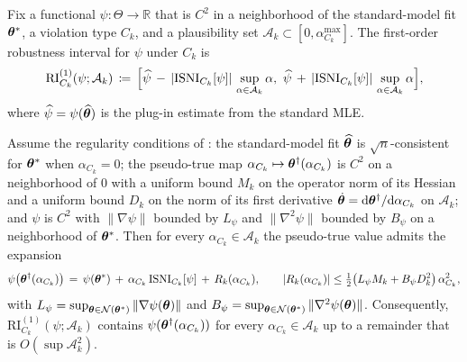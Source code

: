 \begin{definition}
\label{def:robustness-interval}
Fix a functional $\psi \colon \Theta \to \mathbb{R}$ that is $C^2$ in
a neighborhood of the standard-model fit $\bm{\theta}^*$, a violation type
$C_k$, and a plausibility set $\mathcal{A}_k \subset [0,
\alpha_{C_k}^{\max}]$. The first-order robustness interval for $\psi$
under $C_k$ is
\begin{equation}
\label{eq:rob-int}
    \mathrm{RI}_{C_k}^{(1)}(\psi; \mathcal{A}_k)
    \,\coloneqq\,
    \Bigl[
        \widehat\psi
        \,-\, |\mathrm{ISNI}_{C_k}[\psi]|\, \sup_{\alpha \in \mathcal{A}_k} \alpha,
        \ \widehat\psi
        \,+\, |\mathrm{ISNI}_{C_k}[\psi]|\, \sup_{\alpha \in \mathcal{A}_k} \alpha
    \Bigr],
\end{equation}
where $\widehat\psi = \psi(\widehat{\bm{\theta}})$ is the plug-in estimate
from the standard MLE.
\end{definition}

\begin{proposition}
\label{prop:robustness-coverage}
Assume the regularity conditions of :
the standard-model fit $\widehat{\bm{\theta}}$ is $\sqrt{n}$-consistent for
$\bm{\theta}^*$ when $\alpha_{C_k} = 0$; the pseudo-true map
$\alpha_{C_k} \mapsto \bm{\theta}^\dagger(\alpha_{C_k})$ is $C^2$ on a
neighborhood of $0$ with a uniform bound $M_k$ on the operator norm of
its Hessian and a uniform bound $D_k$ on the norm of its first
derivative $\dot{\bm{\theta}} = \mathrm{d}\bm{\theta}^\dagger/\mathrm{d}\alpha_{C_k}$
on $\mathcal{A}_k$; and $\psi$ is $C^2$ with $\|\nabla\psi\|$ bounded
by $L_\psi$ and $\|\nabla^2\psi\|$ bounded by $B_\psi$ on a
neighborhood of $\bm{\theta}^*$. Then for every $\alpha_{C_k} \in
\mathcal{A}_k$ the pseudo-true value admits the expansion
\begin{equation}
\label{eq:rob-sandwich}
    \psi\bigl(\bm{\theta}^\dagger(\alpha_{C_k})\bigr)
    \,=\, \psi(\bm{\theta}^*)
    \,+\, \alpha_{C_k}\, \mathrm{ISNI}_{C_k}[\psi]
    \,+\, R_k(\alpha_{C_k}),
    \qquad
    |R_k(\alpha_{C_k})| \leq \tfrac{1}{2}\bigl(L_\psi M_k + B_\psi D_k^2\bigr)\, \alpha_{C_k}^2,
\end{equation}
with $L_\psi = \sup_{\bm{\theta} \in \mathcal{N}(\bm{\theta}^*)} \|\nabla
\psi(\bm{\theta})\|$ and $B_\psi = \sup_{\bm{\theta} \in
\mathcal{N}(\bm{\theta}^*)} \|\nabla^2\psi(\bm{\theta})\|$. Consequently,
$\mathrm{RI}_{C_k}^{(1)}(\psi; \mathcal{A}_k)$ contains
$\psi(\bm{\theta}^\dagger(\alpha_{C_k}))$ for every $\alpha_{C_k} \in
\mathcal{A}_k$ up to a remainder that is $O(\sup \mathcal{A}_k^2)$.
\end{proposition}

